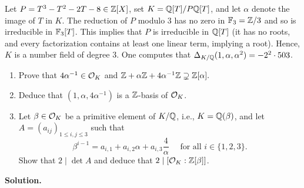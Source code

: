 \documentclass[a4paper,11pt]{article}
\begin{document}
Let $P = T^3-T^2-2T-8 \in \mathbb{Z}[X]$, set $K = \mathbb{Q}[T]/P\mathbb{Q}[T]$,
and let $\alpha$ denote the image of $T$ in $K$. The reduction of $P$ modulo $3$
has no zero in $\mathbb{F}_3 = \mathbb{Z}/3\/$ and so is irreducible in $\mathbb{F}_3[T]$. This
implies that $P$ is irreducible in $\mathbb{Q}[T]$ (it has no roots, and every factorization
contains at least one linear term, implying a root). Hence, $K$ is a number field 
of degree 3. One computes that $\Delta_{K/\mathbb{Q}}(1, \alpha, \alpha^2) = -2^2 \cdot 503$.
\begin{enumerate}
    \item Prove that $4\alpha^{-1} \in \mathcal{O}_K$ and $\mathbb{Z} + \alpha \mathbb{Z} + 
        4\alpha^{-1}\mathbb{Z} \supsetneq \mathbb{Z}[\alpha].$
    \item Deduce that $(1, \alpha, 4\alpha^{-1})$ is a $\mathbb{Z}$-basis of $\mathcal{O}_K$.
    \item Let $\beta \in \mathcal{O}_K$ be a primitive element of $K/\mathbb{Q}$,
        i.e., $K = \mathbb{Q}(\beta)$, and let $A = (a_{ij})_{1 \leq i,j \leq 3}$ 
        such that 
        \begin{equation*}
            \beta^{i-1} = a_{i,1} + a_{i,2}\alpha + a_{i,3}\frac{4}\alpha \quad
            \text{ for all } i \in \{1,2,3\}.
        \end{equation*}
        Show that $2 \mid \det A$ and deduce that $2 \mid [\mathcal{O}_K:\mathbb{Z}[\beta]]$. 
\end{enumerate}
\textbf{Solution.}
\end{document}
